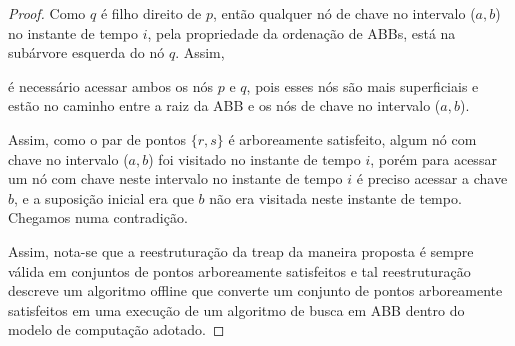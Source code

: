 \begin{proof}
Como $q$ é filho direito de $p$, então qualquer nó de chave no intervalo ($a,b$) no instante de tempo $i$, pela propriedade da ordenação de ABBs, está na subárvore esquerda do nó $q$. Assim,

é necessário acessar ambos os nós $p$ e $q$, pois esses nós são mais superficiais e estão no caminho entre a raiz da ABB e os nós de chave no intervalo ($a,b$).

Assim, como o par de pontos $\{r,s\}$ é arboreamente satisfeito, algum nó com chave no intervalo ($a,b$) foi visitado no instante de tempo $i$, porém para acessar um nó com chave neste intervalo no instante de tempo $i$ é preciso acessar a chave $b$, e a suposição inicial era que $b$ não era visitada neste instante de tempo. Chegamos numa contradição.

Assim, nota-se que a reestruturação da treap da maneira proposta é sempre válida em conjuntos de pontos arboreamente satisfeitos e tal reestruturação descreve um algoritmo offline que converte um conjunto de pontos arboreamente satisfeitos em uma execução de um algoritmo de busca em ABB dentro do modelo de computação adotado.
\end{proof}



